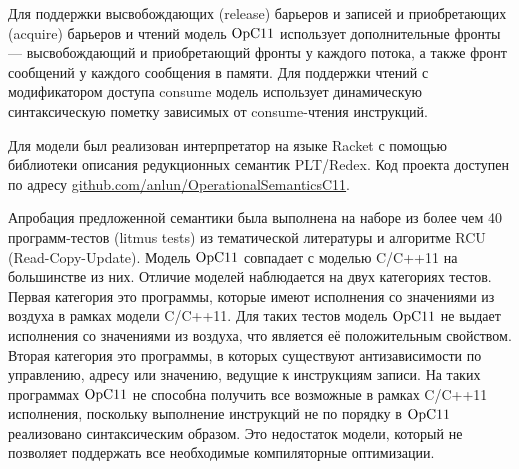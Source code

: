 Для поддержки высвобождающих (release) барьеров и записей и приобретающих (acquire) барьеров и чтений
модель $\mathrm{OpC11}$ использует дополнительные фронты --- высвобождающий и приобретающий фронты у каждого потока,
а также фронт сообщений у каждого сообщения в памяти. Для поддержки чтений с модификатором доступа
consume модель использует динамическую синтаксическую пометку зависимых от consume-чтения инструкций.


Для модели был реализован интерпретатор на языке Racket с помощью библиотеки описания редукционных
семантик PLT/Redex. Код проекта доступен по адресу \url{github.com/anlun/OperationalSemanticsC11}.

Апробация предложенной семантики была выполнена на наборе из более чем 40 программ-тестов (litmus tests) из тематической литературы
и алгоритме RCU (Read-Copy-Update). Модель $\mathrm{OpC11}$ совпадает с моделью C/C++11 на большинстве из них.
Отличие моделей наблюдается на двух категориях тестов. Первая категория это программы, которые имеют исполнения со
значениями из воздуха в рамках модели C/C++11. Для таких тестов модель $\mathrm{OpC11}$ не выдает исполнения со значениями из воздуха,
что является её положительным свойством. Вторая категория это программы, в которых существуют антизависимости по управлению,
адресу или значению, ведущие к инструкциям записи. На таких программах $\mathrm{OpC11}$ не способна получить все возможные в рамках C/C++11
исполнения, поскольку выполнение инструкций не по порядку в $\mathrm{OpC11}$ реализовано синтаксическим образом. Это недостаток модели,
который не позволяет поддержать все необходимые компиляторные оптимизации.

